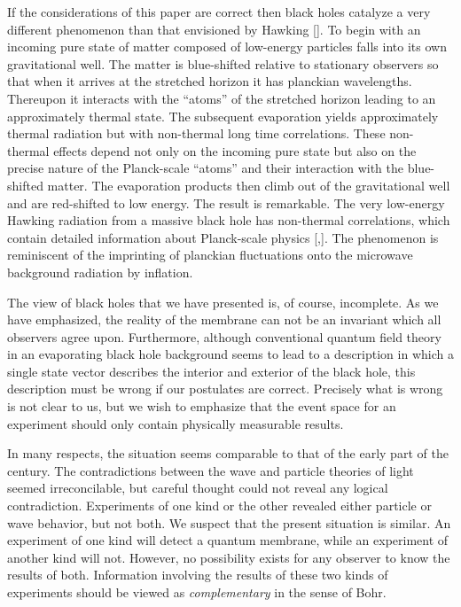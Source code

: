 If the considerations of this paper are correct then black holes
catalyze a very different phenomenon than that envisioned by Hawking
[\haw].  To begin with an incoming pure state of matter composed of
low-energy particles falls into its own gravitational well.  The
matter is blue-shifted relative to stationary observers so that when
it arrives at the stretched horizon it has planckian wavelengths.
Thereupon it interacts with the ``atoms'' of the stretched horizon
leading to an approximately thermal state.  The subsequent
evaporation yields approximately thermal radiation but with
non-thermal long time correlations.  These non-thermal effects depend
not only on the incoming pure state but also on the precise nature of
the Planck-scale ``atoms'' and their interaction with the
blue-shifted matter.  The evaporation products then climb out of the
gravitational well and are red-shifted to low energy.  The result is
remarkable.  The very low-energy Hawking radiation from a massive
black hole has non-thermal correlations, which contain detailed
information about Planck-scale physics [\tHooftone,\svv].  The
phenomenon is reminiscent of the imprinting of planckian fluctuations
onto the microwave background radiation by inflation.


The view of black holes that we have presented is, of course,
incomplete.  As we have emphasized, the reality of the membrane can
not be an invariant which all observers agree upon.  Furthermore,
although conventional quantum field theory in an evaporating black
hole background seems to lead to a description in which a single
state vector describes the interior and exterior of the black hole,
this description must be wrong if our postulates are correct.
Precisely what is wrong is not clear to us, but we wish to emphasize
that the event space for an experiment should only contain physically
measurable results.

In many respects, the situation seems comparable to that of the early
part of the century.  The contradictions between the wave and
particle theories of light seemed irreconcilable, but careful thought
could not reveal any logical contradiction.  Experiments of one kind
or the other revealed either particle or wave behavior, but not both.
 We suspect that the present situation is similar.  An experiment of
one kind will detect a quantum membrane, while an experiment of
another kind will not.  However, no possibility exists for any
observer to know the results of both.  Information involving the
results of these two kinds of experiments should be viewed as {\it
complementary \/} in the sense of Bohr.

